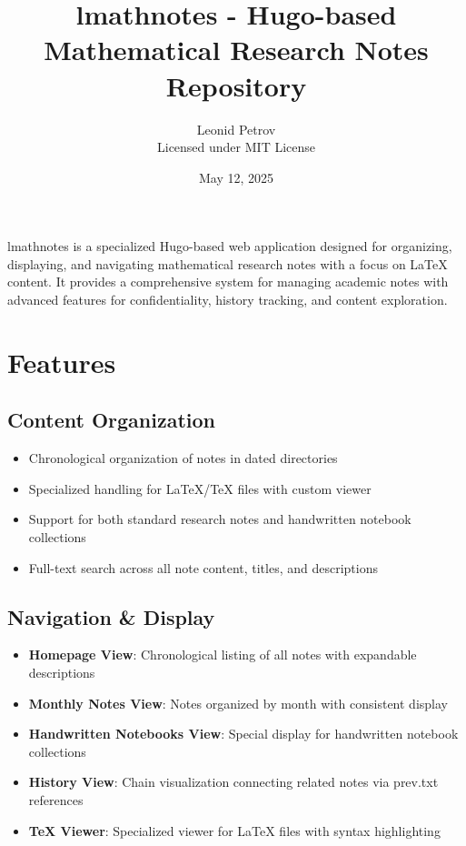 \documentclass{article}
\title{lmathnotes - Hugo-based Mathematical Research Notes Repository}
\author{Leonid Petrov \\ \small{Licensed under MIT License}}
\date{May 12, 2025}
\begin{document}
\maketitle

lmathnotes is a specialized Hugo-based web application designed for organizing, displaying, and navigating mathematical research notes with a focus on LaTeX content. It provides a comprehensive system for managing academic notes with advanced features for confidentiality, history tracking, and content exploration.

\section{Features}

\subsection{Content Organization}
\begin{itemize}
  \item Chronological organization of notes in dated directories
  \item Specialized handling for LaTeX/TeX files with custom viewer
  \item Support for both standard research notes and handwritten notebook collections
  \item Full-text search across all note content, titles, and descriptions
\end{itemize}

\subsection{Navigation \& Display}
\begin{itemize}
  \item \textbf{Homepage View}: Chronological listing of all notes with expandable descriptions
  \item \textbf{Monthly Notes View}: Notes organized by month with consistent display
  \item \textbf{Handwritten Notebooks View}: Special display for handwritten notebook collections
  \item \textbf{History View}: Chain visualization connecting related notes via prev.txt references
  \item \textbf{TeX Viewer}: Specialized viewer for LaTeX files with syntax highlighting
\end{itemize}
\end{document}
